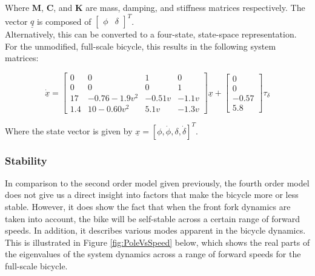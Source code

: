 Where $\mathbf{M}$, $\mathbf{C}$, and $\mathbf{K}$ are mass, damping, and stiffness matrices respectively. The vector $\underline{q}$ is composed of $\begin{bmatrix} \phi & \delta \end{bmatrix}^T$. \\

Alternatively, this can be converted to a four-state, state-space representation. For the unmodified, full-scale bicycle, this results in the following system matrices:

\begin{equation*}
\underline{\dot{x}} = 
\begin{bmatrix}
0 & 0 & 1 & 0 \\
0 & 0 & 0 & 1 \\
17 & -0.76 - 1.9v^2 & -0.51v & -1.1v \\
1.4 & 10-0.60v^2 & 5.1v & -1.3v
\end{bmatrix} \underline{x} + \begin{bmatrix}
0 \\
0 \\
-0.57 \\
5.8
\end{bmatrix} \tau_{\delta}
\end{equation*}

Where the state vector is given by $\underline{x} = [\phi, \dot{\phi}, \delta, \dot{\delta}]^T$.

\subsubsection{Stability}
In comparison to the second order model given previously, the fourth order model does not give us a direct insight into factors that make the bicycle more or less stable. However, it does show the fact that when the front fork dynamics are taken into account, the bike will be self-stable across a certain range of forward speeds. In addition, it describes various modes apparent in the bicycle dynamics. This is illustrated in Figure \ref{fig:PoleVsSpeed} below, which shows the real parts of the eigenvalues of the system dynamics across a range of forward speeds for the full-scale bicycle.

